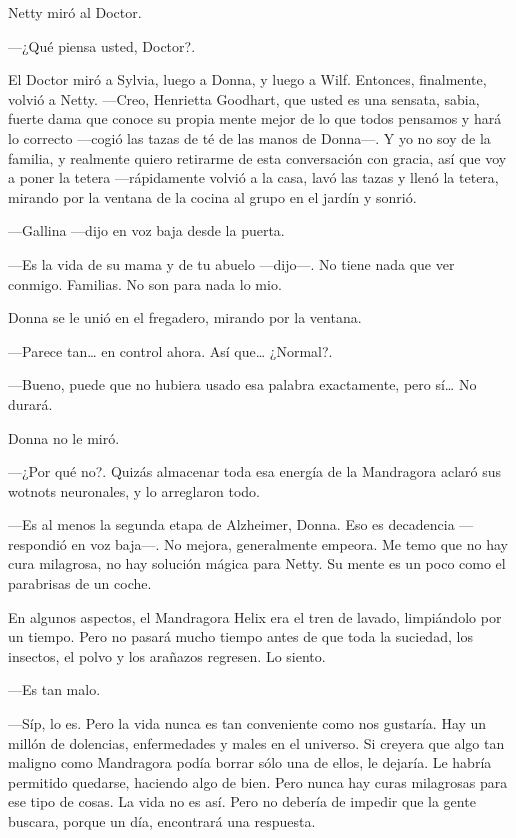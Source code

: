 Netty miró al Doctor.

---¿Qué piensa usted, Doctor?.

El Doctor miró a Sylvia, luego a Donna, y luego a Wilf. Entonces,
finalmente, volvió a Netty. ---Creo, Henrietta Goodhart, que usted es
una sensata, sabia, fuerte dama que conoce su propia mente mejor de lo
que todos pensamos y hará lo correcto ---cogió las tazas de té de las
manos de Donna---. Y yo no soy de la familia, y realmente quiero
retirarme de esta conversación con gracia, así que voy a poner la tetera
---rápidamente volvió a la casa, lavó las tazas y llenó la tetera,
mirando por la ventana de la cocina al grupo en el jardín y sonrió.

---Gallina ---dijo en voz baja desde la puerta.

---Es la vida de su mama y de tu abuelo ---dijo---. No tiene nada que
ver conmigo. Familias. No son para nada lo mio.

Donna se le unió en el fregadero, mirando por la ventana.

---Parece tan\ldots{} en control ahora. Así que\ldots{} ¿Normal?.

---Bueno, puede que no hubiera usado esa palabra exactamente, pero
sí\ldots{} No durará.

Donna no le miró.

---¿Por qué no?. Quizás almacenar toda esa energía de la Mandragora
aclaró sus wotnots neuronales, y lo arreglaron todo.

---Es al menos la segunda etapa de Alzheimer, Donna. Eso es decadencia
---respondió en voz baja---. No mejora, generalmente empeora. Me temo
que no hay cura milagrosa, no hay solución mágica para Netty. Su mente
es un poco como el parabrisas de un coche.

En algunos aspectos, el Mandragora Helix era el tren de lavado,
limpiándolo por un tiempo. Pero no pasará mucho tiempo antes de que toda
la suciedad, los insectos, el polvo y los arañazos regresen. Lo siento.

---Es tan malo.

---Síp, lo es. Pero la vida nunca es tan conveniente como nos gustaría.
Hay un millón de dolencias, enfermedades y males en el universo. Si
creyera que algo tan maligno como Mandragora podía borrar sólo una de
ellos, le dejaría. Le habría permitido quedarse, haciendo algo de bien.
Pero nunca hay curas milagrosas para ese tipo de cosas. La vida no es
así. Pero no debería de impedir que la gente buscara, porque un día,
encontrará una respuesta.


